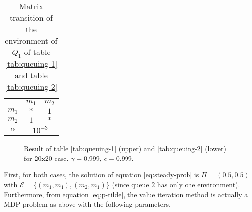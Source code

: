 \documentclass[
  a4paper, xcolor = usenames,dvipsnames]{article}
\theoremstyle{definition}
\theoremstyle{definition}
\theoremstyle{definition}
\theoremstyle{definition}
\theoremstyle{remark}
\begin{document}
\begin{table}[!htbp]
\caption{Matrix transition of the environment of $Q_{1}$ of table \ref{tab:queuing-1} and table \ref{tab:queuing-2}}
\begin{center}
\begin{tabular}{c c c}
    \hline
    & $m_{1}$ & $m_{2}$ \\
    $m_{1}$ & $*$ & $1$ \\
    $m_{2}$ & $1$ & $*$ \\
    \hline
    $\alpha$ & \multicolumn{2}{c}{$10^{-3}$} \\
    \hline
\end{tabular}
\end{center}
\label{tab:queuing-1-mat-1}
\end{table}



\begin{figure}

{\centering {}\newline{}

}

\caption{Result of table \ref{tab:queuing-1} (upper) and \ref{tab:queuing-2} (lower) for 20x20 case. \(\gamma = 0.999\), \(\epsilon = 0.999\).}\label{fig:20x20-queuing-1-2}
\end{figure}

First, for both cases, the solution of equation \eqref{eq:steady-prob} is \(\Pi = (0.5, 0.5)\) with \(\mathcal{E} = \{(m_{1}, m_{1}), (m_{2}, m_{1})\}\) (since queue \(2\) has only one environment). Furthermore, from equation \eqref{eq:p-tilde}, the value iteration method is actually a MDP problem as above with the following parameters.
\end{document}
